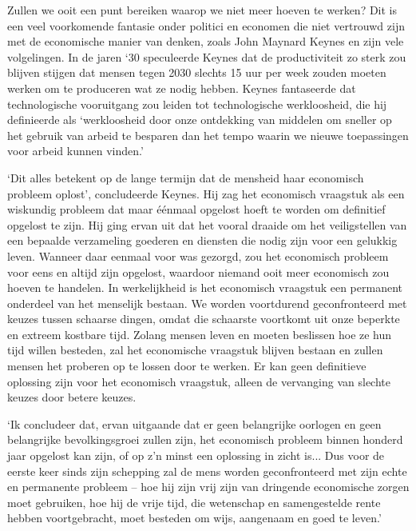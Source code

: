 Zullen we ooit een punt bereiken waarop we niet meer hoeven te werken?
Dit is een veel voorkomende fantasie onder politici en economen die niet
vertrouwd zijn met de economische manier van denken, zoals John Maynard
Keynes en zijn vele volgelingen. In de jaren `30 speculeerde Keynes dat
de productiviteit zo sterk zou blijven stijgen dat mensen tegen 2030
slechts 15 uur per week zouden moeten werken om te produceren wat ze
nodig hebben. Keynes fantaseerde dat technologische vooruitgang zou
leiden tot technologische werkloosheid, die hij definieerde als
`werkloosheid door onze ontdekking van middelen om sneller op het
gebruik van arbeid te besparen dan het tempo waarin we nieuwe
toepassingen voor arbeid kunnen vinden.'\autocite{43}

`Dit alles betekent op de lange termijn dat de mensheid haar economisch
probleem oplost', concludeerde Keynes. Hij zag het economisch vraagstuk
als een wiskundig probleem dat maar éénmaal opgelost hoeft te worden om
definitief opgelost te zijn. Hij ging ervan uit dat het vooral draaide
om het veiligstellen van een bepaalde verzameling goederen en diensten
die nodig zijn voor een gelukkig leven. Wanneer daar eenmaal voor was
gezorgd, zou het economisch probleem voor eens en altijd zijn opgelost,
waardoor niemand ooit meer economisch zou hoeven te handelen. In
werkelijkheid is het economisch vraagstuk een permanent onderdeel van
het menselijk bestaan. We worden voortdurend geconfronteerd met keuzes
tussen schaarse dingen, omdat die schaarste voortkomt uit onze beperkte
en extreem kostbare tijd. Zolang mensen leven en moeten beslissen hoe ze
hun tijd willen besteden, zal het economische vraagstuk blijven bestaan
en zullen mensen het proberen op te lossen door te werken. Er kan geen
definitieve oplossing zijn voor het economisch vraagstuk, alleen de
vervanging van slechte keuzes door betere keuzes.

`Ik concludeer dat, ervan uitgaande dat er geen belangrijke oorlogen en
geen belangrijke bevolkingsgroei zullen zijn, het economisch probleem
binnen honderd jaar opgelost kan zijn, of op z'n minst
een oplossing in zicht is... Dus voor de eerste keer sinds zijn
schepping zal de mens worden geconfronteerd met zijn echte en permanente
probleem -- hoe hij zijn vrij zijn van dringende economische zorgen moet
gebruiken, hoe hij de vrije tijd, die wetenschap en samengestelde rente
hebben voortgebracht, moet besteden om wijs, aangenaam en goed te
leven.'\autocite{45}

